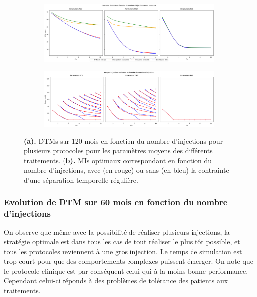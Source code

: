 \documentclass[12pt,a4paper]{article}
\begin{document}
\begin{figure}

    \centering
    \begin{subfigure}[t]{\textwidth}
        \centering
        \includegraphics[width=\textwidth]{Image/effet_inj_mult_120_nontox.png} 
        \caption{} \label{fig:DTM_120m_nontox}
    \end{subfigure}

    \vspace{0.5cm}

    \begin{subfigure}[t]{\textwidth}
        \centering
        \includegraphics[width=\textwidth]{Image/mi_inj_mult_120_nontox.png}
        \caption{} \label{fig:mi_120m_nontox}
    \end{subfigure}

    \caption{\textbf{(a).} \acp{DTM} sur 120 mois en fonction du nombre d'injections pour plusieurs protocoles pour les paramètres moyens des différents traitements. \textbf{(b).} \acp{MI} optimaux correspondant en fonction du nombre d'injections, avec (en rouge) ou sans (en bleu) la contrainte d'une séparation temporelle régulière.}
\end{figure}
\subsubsection[Injections multiples 60 mois]{Evolution de \acf{DTM} sur 60 mois en fonction du nombre d'injections}
On observe que même avec la possibilité de réaliser plusieurs injections, la stratégie optimale est dans tous les cas de tout réaliser le plus tôt possible, et tous les protocoles reviennent à une gros injection. Le temps de simulation est trop court pour que des comportements complexes puissent émerger. On note que le protocole clinique est par conséquent celui qui à la moins bonne performance. Cependant celui-ci réponds à des problèmes de tolérance des patients aux traitements.
\end{document}
